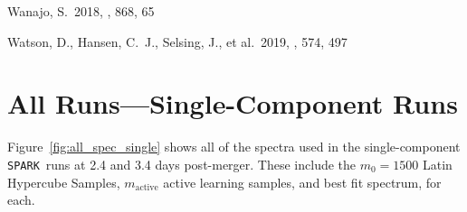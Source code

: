 \documentclass[twocolumn, twocolappendix]{aastex63}
\def\SPARK{\texttt{SPARK}}
\begin{document}
\begin{thebibliography}{}


 Wanajo, S.\ 2018, \apj, 868, 65






 Watson, D., Hansen, C.~J., Selsing, J., et al.\ 2019, \nat, 574, 497


















\end{thebibliography}


\appendix{}

\section{All Runs---Single-Component Runs}\label{app:allspec_single}

Figure~\ref{fig:all_spec_single} shows all of the spectra used in the single-component \SPARK~runs at 2.4 and 3.4 days post-merger. These include the $m_0 = 1500$ Latin Hypercube Samples, $m_{\mathrm{active}}$ active learning samples, and best fit spectrum, for each. 
\end{document}
